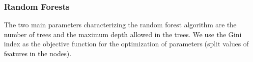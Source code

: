 \subsubsection{Random Forests}

The two main parameters characterizing the random forest algorithm are the number of trees and the maximum depth allowed in the trees. 
We use the Gini index as the objective function for the optimization of parameters (split values of features in the nodes).

